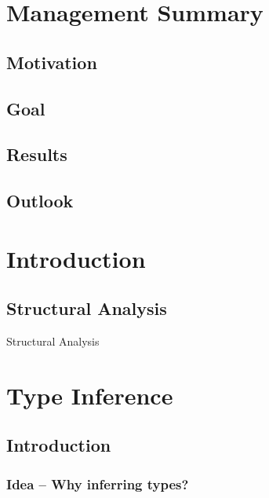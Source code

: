\documentclass[12pt,halfparskip]{scrreprt}
\begin{document}
\chapter*{Management Summary}

\section*{Motivation}

\section*{Goal}

\section*{Results}

\section*{Outlook}


\newpage

\tableofcontents

\newpage
{}
\pagestyle{scrheadings}

\chapter{Introduction}

\section{Structural Analysis}

Structural Analysis

\chapter{Type Inference}

\section{Introduction}

\subsection{Idea – Why inferring types?}
\end{document}
